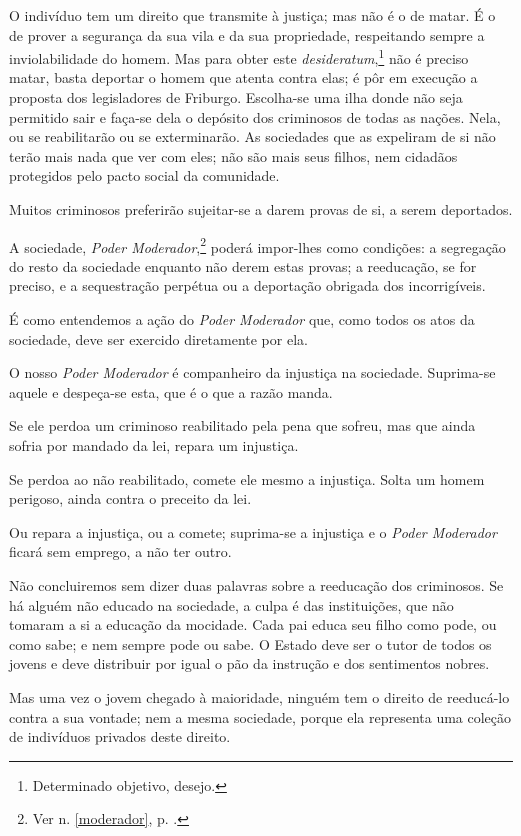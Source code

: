 O indivíduo tem um direito que transmite à justiça; mas não é o de
matar. É o de prover a segurança da sua vila e da sua propriedade,
respeitando sempre a inviolabilidade do homem. Mas para obter este
\emph{desideratum},\footnote{Determinado objetivo, desejo.} não é
preciso matar, basta deportar o homem que atenta contra elas; é pôr em
execução a proposta dos legisladores de Friburgo. Escolha-se uma ilha
donde não seja permitido sair e faça-se dela o depósito dos criminosos
de todas as nações. Nela, ou se reabilitarão ou se exterminarão. As
sociedades que as expeliram de si não terão mais nada que ver com eles;
não são mais seus filhos, nem cidadãos protegidos pelo pacto social da
comunidade.

Muitos criminosos preferirão sujeitar-se a darem provas de si, a serem
deportados.

A sociedade, \emph{Poder Moderador},\footnote{Ver n. \ref{moderador}, p. 
\pageref{moderador}.} poderá impor-lhes como condições: a segregação 
do resto da sociedade enquanto não derem estas provas; a reeducação, 
se for preciso, e a sequestração perpétua ou a deportação obrigada dos incorrigíveis.

É como entendemos a ação do \emph{Poder Moderador} que, como todos os
atos da sociedade, deve ser exercido diretamente por ela.

O nosso \emph{Poder Moderador} é companheiro da injustiça na sociedade.
Suprima-se aquele e despeça-se esta, que é o que a razão manda.

Se ele perdoa um criminoso reabilitado pela pena que sofreu, mas que
ainda sofria por mandado da lei, repara um injustiça.

Se perdoa ao não reabilitado, comete ele mesmo a injustiça. Solta um
homem perigoso, ainda contra o preceito da lei.

Ou repara a injustiça, ou a comete; suprima-se a injustiça e o
\emph{Poder Moderador} ficará sem emprego, a não ter outro.

Não concluiremos sem dizer duas palavras sobre a reeducação dos
criminosos. Se há alguém não educado na sociedade, a culpa é das
instituições, que não tomaram a si a educação da mocidade. Cada pai
educa seu filho como pode, ou como sabe; e nem sempre pode ou sabe. O
Estado deve ser o tutor de todos os jovens e deve distribuir por igual o
pão da instrução e dos sentimentos nobres.

Mas uma vez o jovem chegado à maioridade, ninguém tem o direito de
reeducá-lo contra a sua vontade; nem a mesma sociedade, porque ela
representa uma coleção de indivíduos privados deste direito.


